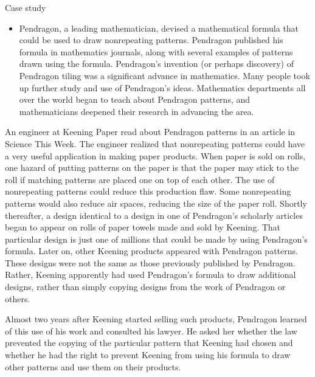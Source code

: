 \documentclass[
  ignorenonframetext,
  aspectratio=169]{beamer}
\providecommand{\tightlist}{%
  \setlength{\itemsep}{0pt}\setlength{\parskip}{0pt}}
\begin{document}
\begin{frame}{Case study}
\protect\hypertarget{case-study}{}
\begin{itemize}
\tightlist
\item
  Pendragon, a leading mathematician, devised a mathematical formula
  that could be used to draw nonrepeating patterns. Pendragon published
  his formula in mathematics journals, along with several examples of
  patterns drawn using the formula. Pendragon's invention (or perhaps
  discovery) of Pendragon tiling was a significant advance in
  mathematics. Many people took up further study and use of Pendragon's
  ideas. Mathematics departments all over the world began to teach about
  Pendragon patterns, and mathematicians deepened their research in
  advancing the area.
\end{itemize}
\end{frame}

\begin{frame}{}
\protect\hypertarget{section-7}{}
An engineer at Keening Paper read about Pendragon patterns in an article
in Science This Week. The engineer realized that nonrepeating patterns
could have a very useful application in making paper products. When
paper is sold on rolls, one hazard of putting patterns on the paper is
that the paper may stick to the roll if matching patterns are placed one
on top of each other. The use of nonrepeating patterns could reduce this
production flaw. Some nonrepeating patterns would also reduce air
spaces, reducing the size of the paper roll. Shortly thereafter, a
design identical to a design in one of Pendragon's scholarly articles
began to appear on rolls of paper towels made and sold by Keening. That
particular design is just one of millions that could be made by using
Pendragon's formula. Later on, other Keening products appeared with
Pendragon patterns. These designs were not the same as those previously
published by Pendragon. Rather, Keening apparently had used Pendragon's
formula to draw additional designs, rather than simply copying designs
from the work of Pendragon or others.
\end{frame}

\begin{frame}{}
\protect\hypertarget{section-8}{}
Almost two years after Keening started selling such products, Pendragon
learned of this use of his work and consulted his lawyer. He asked her
whether the law prevented the copying of the particular pattern that
Keening had chosen and whether he had the right to prevent Keening from
using his formula to draw other patterns and use them on their products.
\end{frame}
\end{document}
